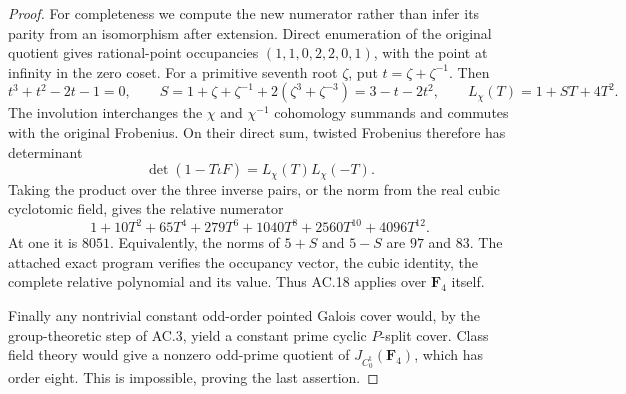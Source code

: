 \begin{proof}
For completeness we compute the new numerator rather than infer its
parity from an isomorphism after extension.  Direct enumeration of the
original quotient gives rational-point occupancies
$(1,1,0,2,2,0,1)$, with the point at infinity in the zero coset.
For a primitive seventh root $\zeta$, put $t=\zeta+\zeta^{-1}$.
Then
\[
 t^3+t^2-2t-1=0,
 \qquad S=1+\zeta+\zeta^{-1}+2(\zeta^3+\zeta^{-3})
           =3-t-2t^2,
 \qquad L_{\chi}(T)=1+ST+4T^2.
\]
The involution interchanges the $\chi$ and $\chi^{-1}$ cohomology
summands and commutes with the original Frobenius.  On their direct
sum, twisted Frobenius therefore has determinant
\[
       \det(1-T\widetilde\iota F)
              =L_\chi(T)L_\chi(-T).
\]
Taking the product over the three inverse pairs, or the norm from the
real cubic cyclotomic field, gives the relative numerator
\[
 1+10T^2+65T^4+279T^6+1040T^8+2560T^{10}+4096T^{12}.
\]
At one it is $8051$.  Equivalently, the norms of $5+S$ and $5-S$ are
$97$ and $83$.  The attached exact program verifies the occupancy
vector, the cubic identity, the complete relative polynomial and its
value.  Thus AC.18 applies over $\mathbf F_4$ itself.

Finally any nontrivial constant odd-order pointed Galois cover would,
by the group-theoretic step of AC.3, yield a constant prime cyclic
$P$-split cover.  Class field theory would give a nonzero odd-prime
quotient of $J_{C_0^{\mathrm t}}(\mathbf F_4)$, which has order eight.
This is impossible, proving the last assertion.
\end{proof}

